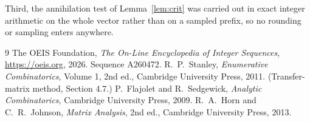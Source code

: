 \documentclass[11pt,a4paper]{article}
\theoremstyle{plain}
\theoremstyle{definition}
\begin{document}
Third, the annihilation test of Lemma~\ref{lem:crit} was carried out in exact integer
arithmetic on the whole vector rather than on a sampled prefix, so no rounding or sampling
enters anywhere.

\begin{thebibliography}{9}
 The OEIS Foundation, \emph{The On-Line Encyclopedia of Integer
Sequences}, \url{https://oeis.org}, 2026. Sequence A260472.
 R.~P.~Stanley, \emph{Enumerative Combinatorics}, Volume 1, 2nd ed.,
Cambridge University Press, 2011. (Transfer-matrix method, Section 4.7.)
 P.~Flajolet and R.~Sedgewick, \emph{Analytic Combinatorics}, Cambridge
University Press, 2009.
 R.~A.~Horn and C.~R.~Johnson, \emph{Matrix Analysis}, 2nd ed., Cambridge
University Press, 2013.
\end{thebibliography}
\end{document}

